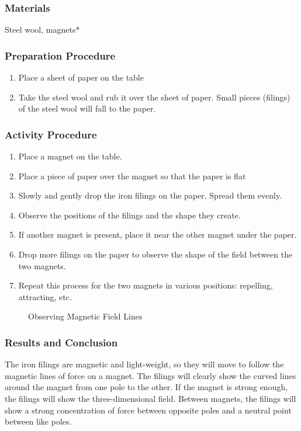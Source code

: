 \subsubsection*{Materials}
Steel wool, magnets*

\subsubsection*{Preparation Procedure}
\begin{enumerate}
\item{Place a sheet of paper on the table}
\item{Take the steel wool and rub it over the sheet of paper.  Small pieces (filings) of the steel wool will fall to the paper.}
\end{enumerate}

\subsubsection*{Activity Procedure}
\begin{enumerate}
\item{Place a magnet on the table.}
\item{Place a piece of paper over the magnet so that the paper is flat}
\item{Slowly and gently drop the iron filings on the paper.  Spread them evenly.}
\item{Observe the positions of the filings and the shape they create.}
\item{If another magnet is present, place it near the other magnet under the paper.}
\item{Drop more filings on the paper to observe the shape of the field between the two magnets.}
\item{Repeat this process for the two magnets in various positions: repelling, attracting, etc.}
\end{enumerate}

\begin{figure}
\begin{center}
\def\svgwidth{150pt}

\caption{Observing Magnetic Field Lines}
\label{fig:magnetic-fields}
\end{center}
\end{figure}

\subsubsection*{Results and Conclusion}
The iron filings are magnetic and light-weight, so they will move to follow the magnetic lines of force on a magnet.  The filings will clearly show the curved lines around the magnet from one pole to the other.  If the magnet is strong enough, the filings will show the three-dimensional field.
Between magnets, the filings will show a strong concentration of force between opposite poles and a neutral point between like poles.


